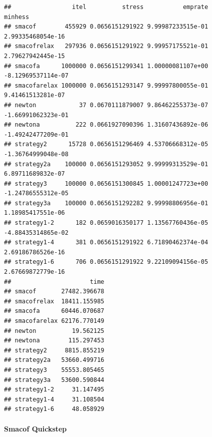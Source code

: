 \documentclass[
  12pt,
]{article}
\newenvironment{Shaded}{\begin{snugshade}}{\end{snugshade}}
\newcommand{\AttributeTok}[1]{\textcolor[rgb]{0.13,0.29,0.53}{#1}}
\newcommand{\DecValTok}[1]{\textcolor[rgb]{0.00,0.00,0.81}{#1}}
\newcommand{\FunctionTok}[1]{\textcolor[rgb]{0.13,0.29,0.53}{\textbf{#1}}}
\newcommand{\NormalTok}[1]{#1}
\newcommand{\OtherTok}[1]{\textcolor[rgb]{0.56,0.35,0.01}{#1}}
\newcommand{\SpecialCharTok}[1]{\textcolor[rgb]{0.81,0.36,0.00}{\textbf{#1}}}
\begin{document}
\begin{verbatim}
##                 itel          stress           emprate            minhess
## smacof        455929 0.0656151291922 9.99987233515e-01  2.99335468054e-16
## smacofrelax   297936 0.0656151291922 9.99957175521e-01  2.79627942445e-15
## smacofa      1000000 0.0656151299341 1.00000081107e+00 -8.12969537114e-07
## smacofarelax 1000000 0.0656151293147 9.99997800055e-01  9.41461513281e-07
## newton            37 0.0670111879007 9.86462255373e-07 -1.66991062323e-01
## newtona          222 0.0661927090396 1.31607436892e-06 -1.49242477209e-01
## strategy2      15728 0.0656151296469 4.53706668312e-05 -1.36764999048e-08
## strategy2a    100000 0.0656151293052 9.99999313529e-01  6.89711689832e-07
## strategy3     100000 0.0656151300845 1.00001247723e+00 -1.24786555312e-05
## strategy3a    100000 0.0656151292282 9.99998806956e-01  1.18985417551e-06
## strategy1-2      182 0.0659016350177 1.13567760436e-05 -4.88435314865e-02
## strategy1-4      381 0.0656151291922 6.71890462374e-04  2.69186786526e-16
## strategy1-6      706 0.0656151291922 9.22109094156e-05  2.67669872779e-16
##                      time
## smacof       27482.396678
## smacofrelax  18411.155985
## smacofa      60446.070687
## smacofarelax 62176.770149
## newton          19.562125
## newtona        115.297453
## strategy2     8815.855219
## strategy2a   53660.499716
## strategy3    55553.805465
## strategy3a   53600.590844
## strategy1-2     31.147495
## strategy1-4     31.108504
## strategy1-6     48.058929
\end{verbatim}

\paragraph{Smacof Quickstep}\label{smacof-quickstep-2}

\begin{Shaded}
\end{Shaded}
\end{document}
